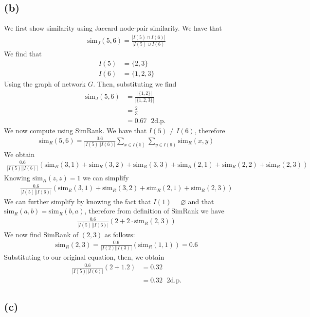 \documentclass[a4paper]{article}
\theoremstyle{plain}
\theoremstyle{definition}
\theoremstyle{remark}
\begin{document}
\subsection{(b)}
We first show similarity using Jaccard node-pair similarity. We have that
\begin{align*}
	\text{sim}_J\left( 5,6 \right) = \frac{ | I(5) \cap I(6) | }{| I(5) \cup I(6)}
\end{align*}
We find that
\begin{align*}
	I(5) &= \{ 2,3 \}\\
		I(6) &= \{ 1,2,3\}
\end{align*}
Using the graph of network $G$. Then, substituting we find
\begin{align*}
	\text{sim}_J\left( 5,6 \right) &= \frac{|\{1,2\}|}{|\{1,2,3\}|} \\
		& = \frac{2}{3}\\
		&= 0.67 \; \text{ 2d.p. }
\end{align*}
We now compute using SimRank. We have that $I(5) \neq I(6)$, therefore
\begin{align*}
	\text{sim}_R(5,6) = \frac{0.6}{|I(5)||I(6)|}\sum_{x \in I(5)}\sum_{y \in I(6)}^{}  \text{sim}_R(x,y)
\end{align*}
We obtain
\begin{align*}
	\frac{0.6}{|I(5)||I(6)|} \left(\text{sim}_R(3,1)+\text{sim}_R(3,2)+\text{sim}_R(3,3)+\text{sim}_R(2,1)+\text{sim}_R(2,2)+\text{sim}_R(2,3)\right)
\end{align*}
Knowing $\text{sim}_R(z,z) = 1$ we can simplify
\begin{align*}
	\frac{0.6}{|I(5)||I(6)|} \left(\text{sim}_R(3,1)+\text{sim}_R(3,2)+\text{sim}_R(2,1)+\text{sim}_R(2,3)\right)
\end{align*}
We can further simplify by knowing the fact that $I(1) = \varnothing$ and that $\text{sim}_R(a,b) = \text{sim}_R(b,a)$, therefore from definition of SimRank we have
\begin{align*}
	\frac{0.6}{|I(5)||I(6)|} \left(2+2\cdot \text{sim}_R(2,3)\right)
\end{align*}
We now find SimRank of $(2,3)$ as follows:
\begin{align*}
	\text{sim}_R(2,3) = \frac{0.6}{|I(2)||I(3)|}\left( \text{sim}_R(1,1) \right) = 0.6
\end{align*}
Substituting to our original equation, then, we obtain
\begin{align*}
	\frac{0.6}{|I(5)||I(6)|} \left(2+1.2\right) &= 0.32 \\
						    &= 0.32 \;\text{ 2d.p.}
\end{align*}
\subsection{(c)}
\end{document}
